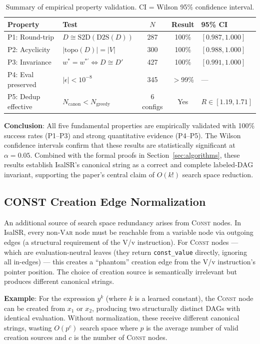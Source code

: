 \begin{table}[h]
\centering
\caption{Summary of empirical property validation. CI = Wilson 95\% confidence interval.}
\label{tab:properties}
\begin{tabular}{llccl}
\toprule
Property & Test & $N$ & Result & 95\% CI \\
\midrule
P1: Round-trip & $D \cong \text{S2D}(\text{D2S}(D))$ & 287 & 100\% & $[0.987, 1.000]$ \\
P2: Acyclicity & $|\text{topo}(D)| = |V|$ & 300 & 100\% & $[0.988, 1.000]$ \\
P3: Invariance & $w^* = w^{*\prime} \!\iff\! D \cong D'$ & 427 & 100\% & $[0.991, 1.000]$ \\
P4: Eval preserved & $|\epsilon| < 10^{-8}$ & 345 & $>$99\% & --- \\
P5: Dedup effective & $N_{\text{canon}} < N_{\text{greedy}}$ & 6 configs & Yes & $R \in [1.19, 1.71]$ \\
\bottomrule
\end{tabular}
\end{table}

\textbf{Conclusion}: All five fundamental properties are empirically validated
with 100\% success rates (P1--P3) and strong quantitative evidence (P4--P5).
The Wilson confidence intervals confirm that these results are statistically
significant at $\alpha = 0.05$. Combined with the formal proofs in
Section~\ref{sec:algorithms}, these results establish IsalSR's canonical string
as a correct and complete labeled-DAG invariant, supporting the paper's central
claim of $O(k!)$ search space reduction.

\subsection{CONST Creation Edge Normalization}

An additional source of search space redundancy arises from \textsc{Const} nodes.
In IsalSR, every non-\textsc{Var} node must be reachable from a variable node via
outgoing edges (a structural requirement of the V/v instruction). For \textsc{Const}
nodes --- which are evaluation-neutral leaves (they return \texttt{const\_value}
directly, ignoring all in-edges) --- this creates a ``phantom'' creation edge from
the V/v instruction's pointer position. The choice of creation source is semantically
irrelevant but produces different canonical strings.

\textbf{Example}: For the expression $y^k$ (where $k$ is a learned constant), the
\textsc{Const} node can be created from $x_1$ or $x_2$, producing two structurally
distinct DAGs with identical evaluation. Without normalization, these receive different
canonical strings, wasting $O(p^c)$ search space where $p$ is the average number of
valid creation sources and $c$ is the number of \textsc{Const} nodes.

